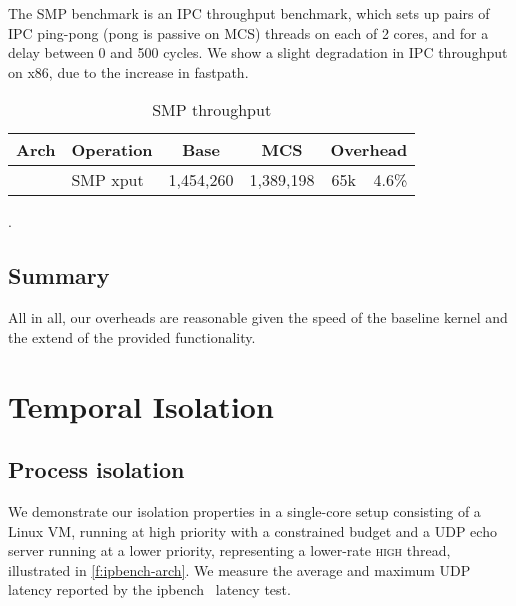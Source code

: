 The SMP benchmark is an IPC throughput benchmark, which sets up pairs of IPC ping-pong
(pong is passive on MCS) threads on each of 2 cores, and for a delay between 0 and 500 cycles.
We show a slight degradation in IPC throughput on x86, due to the increase in fastpath.
\begin{table}[ht]\centering
\begin{tabular}{|c|l| r@{~}l | r@{~}l |r@{~}r|}\hline
\textbf{Arch}           & \multicolumn{1}{c|}{\textbf{Operation}}
                                & \multicolumn{2}{c|}{\textbf{Base}}
                                & \multicolumn{2}{c|}{\textbf{MCS}}
                                & \multicolumn{2}{c|}{\textbf{Overhead}} \\ \hline
%
%
& SMP xput & \multicolumn{2}{l|}{1,454,260} & \multicolumn{2}{l|}{1,389,198} & 65k & 4.6\% \\
\hline
\end{tabular}
\caption{SMP throughput}.
\label{t:micro-smp}
\end{table}

\subsection{Summary}


All in all, our overheads are reasonable given the speed of the baseline kernel and the extend of
the provided functionality.


\section{Temporal Isolation}

\subsection{Process isolation} 
We demonstrate our isolation properties
in a single-core setup consisting of a Linux VM,
running at high priority with a
constrained budget and a UDP echo server running at a lower priority,
representing a lower-rate \textsc{high} thread, illustrated in \autoref{f:ipbench-arch}. We
measure the average  and maximum UDP latency reported by the
ipbench~\citep{Wienand_Macpherson_04} latency test.

